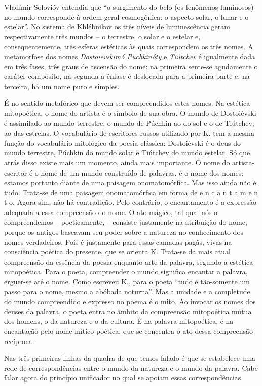 Vladímir Solovióv entendia que ``o surgimento do belo (os fenômenos
luminosos) no mundo corresponde à ordem geral cosmogônica: o aspecto
solar, o lunar e o estelar''. No sistema de Khlébnikov os três níveis de
luminescência geram respectivamente três mundos -- o terrestre, o solar
e o estelar e, consequentemente, três esferas estéticas às quais
correspondem os três nomes. A metamorfose dos nomes \emph{Dostoievskimó
Puchkinóty} e \emph{Tiútchev} é igualmente dada em três fases, três
graus de ascensão do nome: na primeira sente-se agudamente o caráter
compósito, na segunda a ênfase é deslocada para a primeira parte e, na
terceira, há um nome puro e simples.

É no sentido metafórico que devem ser compreendidos estes nomes. Na
estética mitopoética, o nome do artista é o símbolo de sua obra. O mundo
de Dostoiévski é assimilado ao mundo terrestre, o mundo de Púchkin ao do
sol e o de Tiútchev, ao das estrelas. O vocabulário de escritores russos
utilizado por K. tem a mesma função do vocabulário mitológico da poesia
clássica: Dostoiévski é o deus do mundo terrestre, Púchkin do mundo
solar e Tiútchev do mundo estelar. Só que atrás disso existe mais um
momento, ainda mais importante. O nome do artista-escritor é o nome de
um mundo construído de palavras, é o nome dos nomes: estamos portanto
diante de uma paisagem onomatomórfica. Mas isso ainda não é tudo.
Trata-se de uma paisagem onomatomórfica em forma de e n c a n t a m e n
t o. Agora sim, não há contradição. Pelo contrário, o encantamento é a
expressão adequada a essa compreensão do nome. O ato mágico, tal qual
nós o compreendemos -- poeticamente, -- consiste justamente na
atribuição do nome, porque os antigos baseavam seu poder sobre a
natureza no conhecimento dos nomes verdadeiros. Pois é justamente para
essas camadas pagãs, vivas na consciência poética do presente, que se
orienta K. Trata-se da mais atual compreensão da essência da poesia
enquanto arte da palavra, segundo a estética mitopoética. Para o poeta,
compreender o mundo significa encantar a palavra, erguer-se até o nome.
Como escreveu K., para o poeta ``tudo é tão-somente um passo para o
nome, mesmo a abóbada noturna''. Mas a unidade e a completude do mundo
compreendido e expresso no poema é o mito. Ao invocar os nomes dos
deuses da palavra, o poeta entra no âmbito da compreensão mitopoética
mútua dos homens, o da natureza e o da cultura. É na palavra
mitopoética, é na encantação pelo nome mítico-poética, que se concentra
o ato dessa compreensão recíproca.

Nas três primeiras linhas da quadra de que temos falado é que se
estabelece uma rede de correspondências entre o mundo da natureza e o
mundo da palavra. Cabe falar agora do princípio unificador no qual se
apoiam essas correspondências.

